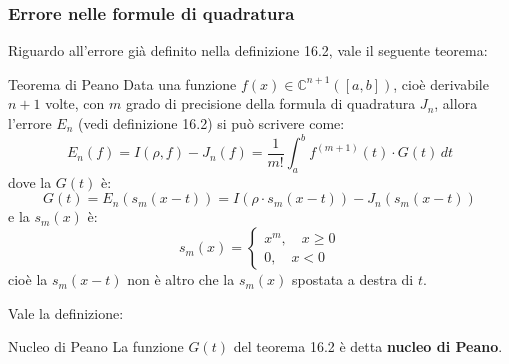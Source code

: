 \documentclass[a4paper,11pt]{article}
\begin{document}
\subsubsection{Errore nelle formule di quadratura}
Riguardo all'errore già definito nella definizione 16.2, vale il seguente teorema:
\begin{theorem}{Teorema di Peano}
	Data una funzione $f(x) \in \mathbb{C}^{n + 1} \left([a, b]\right)$, cioè derivabile $n+1$ volte, con $m$ grado di precisione della formula di quadratura $J_n$, allora l'errore $E_n$ (vedi definizione 16.2) si può scrivere come:
	$$
		E_n(f) = I(\rho, f) - J_n(f) = \frac{1}{m!} \int_a^b f^{(m + 1)}(t) \cdot G(t) \, dt
	$$
	dove la $G(t)$ è:
	$$
		G(t) = E_n (s_m (x - t)) = I(\rho \cdot s_m(x - t)) - J_n (s_m(x - t))
	$$
	e la $s_m(x)$ è:
	$$
		s_m(x) = 
		\begin{cases}
			x^m, \quad x \geq 0 \\
			0, \quad x < 0
		\end{cases}
	$$
	cioè la $s_m(x - t)$ non è altro che la $s_m(x)$ spostata a destra di $t$.
\end{theorem}
Vale la definizione:
\begin{definition}{Nucleo di Peano}
	La funzione $G(t)$ del teorema 16.2 è detta \textbf{nucleo di Peano}. 
\end{definition}
\end{document}
